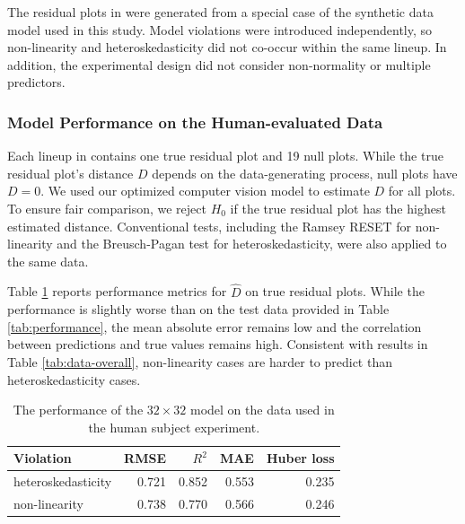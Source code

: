 \documentclass[]{interact}
\theoremstyle{plain}%
\theoremstyle{definition}
\theoremstyle{remark}
\begin{document}
The residual plots in \citet{li2024plot} were generated from a special
case of the synthetic data model used in this study. Model violations
were introduced independently, so non-linearity and heteroskedasticity
did not co-occur within the same lineup. In addition, the experimental
design did not consider non-normality or multiple predictors.

\subsubsection{Model Performance on the Human-evaluated
Data}\label{model-performance-on-the-human-evaluated-data}

Each lineup in \citet{li2024plot} contains one true residual plot and 19
null plots. While the true residual plot's distance \(D\) depends on the
data-generating process, null plots have \(D = 0\). We used our
optimized computer vision model to estimate \(D\) for all plots. To
ensure fair comparison, we reject \(H_0\) if the true residual plot has
the highest estimated distance. Conventional tests, including the Ramsey
RESET \citep{ramsey1969tests} for non-linearity and the Breusch-Pagan
test \citep{breusch1979simple} for heteroskedasticity, were also applied
to the same data.

Table \ref{tab:experiment-performance} reports performance metrics for
\(\hat{D}\) on true residual plots. While the performance is slightly
worse than on the test data provided in Table \ref{tab:performance}, the
mean absolute error remains low and the correlation between predictions
and true values remains high. Consistent with results in Table
\ref{tab:data-overall}, non-linearity cases are harder to predict than
heteroskedasticity cases.

\begin{table}

\caption{\label{tab:experiment-performance}The performance of the $32 \times 32$ model on the data used in the human subject experiment.}
\centering
\begin{tabular}[t]{lrrrr}
\toprule
Violation & RMSE & $R^2$ & MAE & Huber loss\\
\midrule
heteroskedasticity & 0.721 & 0.852 & 0.553 & 0.235\\
non-linearity & 0.738 & 0.770 & 0.566 & 0.246\\
\bottomrule
\end{tabular}
\end{table}
\end{document}
